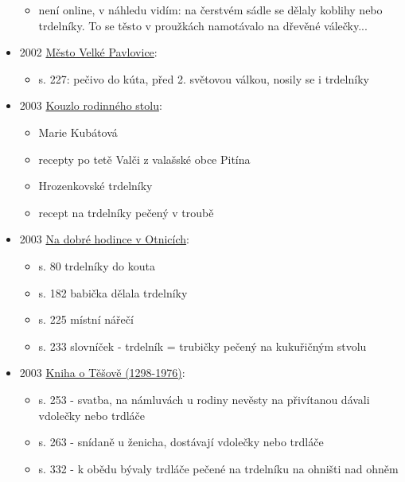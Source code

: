 \begin{itemize}
  \begin{itemize}
  \tightlist
  \item
    není online, v náhledu vidím: na čerstvém sádle se dělaly koblihy
    nebo trdelníky. To se těsto v proužkách namotávalo na dřevěné
    válečky...
  \end{itemize}
\item
  2002
  \href{https://ceskadigitalniknihovna.cz/uuid/uuid:2f7b11a0-3d86-11ed-b06c-005056827e52}{Město
  Velké Pavlovice}:

  \begin{itemize}
  \tightlist
  \item
    s. 227: pečivo do kúta, před 2. světovou válkou, nosily se i
    trdelníky
  \end{itemize}
\item
  2003
  \href{https://ceskadigitalniknihovna.cz/uuid/uuid:99baad60-eb86-11e3-a2c6-005056827e51}{Kouzlo
  rodinného stolu}:

  \begin{itemize}
  \tightlist
  \item
    Marie Kubátová
  \item
    recepty po tetě Valči z valašské obce Pitína
  \item
    Hrozenkovské trdelníky
  \item
    recept na trdelníky pečený v troubě
  \end{itemize}
\item
  2003
  \href{https://ceskadigitalniknihovna.cz/view/uuid:cc3e0ec0-084a-11e6-a611-005056827e51?page=uuid\%3Afaea6360-21de-11e6-8803-005056827e51&fulltext=trdeln\%C3\%ADk\%20OR\%20trdeln\%C3\%ADky\%20OR\%20trdeln\%C3\%ADk\%C5\%AF&source=mzk}{Na
  dobré hodince v Otnicích}:

  \begin{itemize}
  \tightlist
  \item
    s. 80 trdelníky do kouta
  \item
    s. 182 babička dělala trdelníky
  \item
    s. 225 místní nářečí
  \item
    s. 233 slovníček - trdelník = trubičky pečený na kukuřičným stvolu
  \end{itemize}
\item
  2003
  \href{https://ceskadigitalniknihovna.cz/uuid/uuid:d9f114f0-527a-11e3-ac69-005056827e51}{Kniha
  o Těšově (1298-1976)}:

  \begin{itemize}
  \tightlist
  \item
    s. 253 - svatba, na námluvách u rodiny nevěsty na přivítanou dávali
    vdolečky nebo trdláče
  \item
    s. 263 - snídaně u ženicha, dostávají vdolečky nebo trdláče
  \item
    s. 332 - k obědu bývaly trdláče pečené na trdelníku na ohništi nad
    ohněm


\end{itemize}
\end{itemize}
